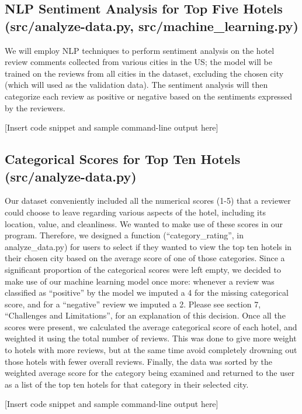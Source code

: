 \documentclass[conference]{IEEEtran}
\begin{document}
	\subsection{NLP Sentiment Analysis for Top Five Hotels (src/analyze-data.py, src/machine\_learning.py)}
	We will employ NLP techniques to perform sentiment analysis on the hotel review comments collected from various cities in the US; the model will be trained on the reviews from all cities in the dataset, excluding the chosen city (which will used as the validation data). The sentiment analysis will then categorize each review as positive or negative based on the sentiments expressed by the reviewers.
	
	[Insert code snippet and sample command-line output here]
	
	\subsection{Categorical Scores for Top Ten Hotels (src/analyze-data.py)}
	Our dataset conveniently included all the numerical scores (1-5) that a reviewer could choose to leave regarding various aspects of the hotel, including its location, value, and cleanliness. We wanted to make use of these scores in our program. Therefore, we designed a function (“category\_rating”, in analyze\_data.py) for users to select if they wanted to view the top ten hotels in their chosen city based on the average score of one of those categories. 
	Since a significant proportion of the categorical scores were left empty, we decided to make use of our machine learning model once more: whenever a review was classified as “positive” by the model we imputed a 4 for the missing categorical score, and for a “negative” review we imputed a 2. Please see section 7, “Challenges and Limitations”, for an explanation of this decision.
	Once all the scores were present, we calculated the average categorical score of each hotel, and weighted it using the total number of reviews. This was done to give more weight to hotels with more reviews, but at the same time avoid completely drowning out those hotels with fewer overall reviews. Finally, the data was sorted by the weighted average score for the category being examined and returned to the user as a list of the top ten hotels for that category in their selected city.
	
	[Insert code snippet and sample command-line output here]
	
\end{document}
